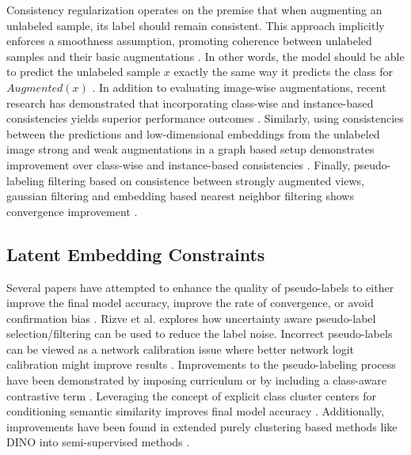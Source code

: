 \documentclass[10pt,twocolumn,letterpaper]{article}
\begin{document}
Consistency regularization operates on the premise that when augmenting an unlabeled sample, its label should remain consistent. 
This approach implicitly enforces a smoothness assumption, promoting coherence between unlabeled samples and their basic augmentations \cite{xie2020unsupervised}. 
In other words, the model should be able to predict the unlabeled sample $x$ exactly the same way it predicts the class for $Augmented(x)$ \cite{berthelot2019mixmatch,sohn2020fixmatch,berthelot2019remixmatch,mustafa2020transformation}. 
In addition to evaluating image-wise augmentations, recent research has demonstrated that incorporating class-wise and instance-based consistencies yields superior performance outcomes \cite{zheng2022simmatch,li2021comatch}. 
Similarly, using consistencies between the predictions and low-dimensional embeddings from the unlabeled image strong and weak augmentations in a graph based setup demonstrates improvement over class-wise and instance-based consistencies \cite{zheng2023simmatchv2}.
Finally, pseudo-labeling filtering based on consistence between strongly augmented views, gaussian filtering and embedding based nearest neighbor filtering shows convergence improvement \cite{kim2022conmatch,menon2022semisupervised}.

\subsection{Latent Embedding Constraints}

Several papers have attempted to enhance the quality of pseudo-labels to either improve the final model accuracy, improve the rate of convergence, or avoid confirmation bias \cite{arazo2020pseudo}.
Rizve et al. \cite{rizve2021defense} explores how uncertainty aware pseudo-label selection/filtering can be used to reduce the label noise.
Incorrect pseudo-labels can be viewed as a network calibration issue \cite{rizve2021defense} where better network logit calibration might improve results \cite{Xing2020DistanceBased}.
Improvements to the pseudo-labeling process have been demonstrated by imposing curriculum \cite{zhang2021flexmatch} or by including a class-aware contrastive term \cite{yang2022class}.
Leveraging the concept of explicit class cluster centers for conditioning semantic similarity improves final model accuracy \cite{zheng2022simmatch}.
Additionally, improvements have been found in extended purely clustering based methods like DINO \cite{caron2021emerging} into semi-supervised methods \cite{fini2023semi}.
\end{document}
